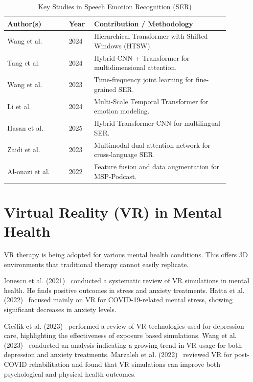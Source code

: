 \begin{table}[H]
\centering
\small
\renewcommand{\arraystretch}{1.3}
\caption{Key Studies in Speech Emotion Recognition (SER)}
\label{tab:ser}
\begin{tabular}{|p{0.25\linewidth}|p{0.1\linewidth}|p{0.55\linewidth}|}
\hline
\rowcolor{gray!15} \textbf{Author(s)} & \textbf{Year} & \textbf{Contribution / Methodology} \\ \hline
Wang et al. & 2024 & Hierarchical Transformer with Shifted Windows (HTSW). \\ \hline
Tang et al. & 2024 & Hybrid CNN + Transformer for multidimensional attention. \\ \hline
Wang et al. & 2023 & Time-frequency joint learning for fine-grained SER. \\ \hline
Li et al. & 2024 & Multi-Scale Temporal Transformer for emotion modeling. \\ \hline
Hasan et al. & 2025 & Hybrid Transformer-CNN for multilingual SER. \\ \hline
Zaidi et al. & 2023 & Multimodal dual attention network for cross-language SER. \\ \hline
Al-onazi et al. & 2022 & Feature fusion and data augmentation for MSP-Podcast. \\ \hline
\end{tabular}
\end{table}

\section{Virtual Reality (VR) in Mental Health}
VR therapy is being adopted for various mental health conditions. This offers 3D environments that traditional therapy cannot easily replicate.

Ionescu et al. (2021)~\cite{ionescu2021review} conducted a systematic review of VR simulations in mental health. He finds positive outcomes in stress and anxiety treatments. Hatta et al. (2022)~\cite{hatta2022review} focused mainly on VR for COVID-19-related mental stress, showing significant decreases in anxiety levels.

Cieślik et al. (2023)~\cite{cieslik2023immersive} performed a review of VR technologies used for depression care, highlighting the effectiveness of exposure based simulations. Wang et al. (2023)~\cite{wang2023depression} conducted an analysis indicating a growing trend in VR usage for both depression and anxiety treatments. Marzaleh et al. (2022)~\cite{marzaleh2022rehab} reviewed VR for post-COVID rehabilitation and found that VR simulations can improve both psychological and physical health outcomes.

